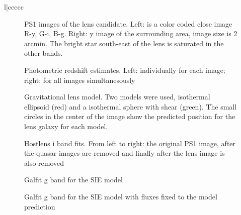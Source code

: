 \documentclass[manuscript]{aastex}
\begin{document}
\begin{deluxetable}{l|ccccc}
\enddata


\end{deluxetable}


\begin{figure}
\caption{
PS1 images of the lens candidate. Left: is a color coded close image R-y, G-i, B-g. Right: y image of the surrounding area, image size is 2 arcmin. The bright star south-east of the lens is saturated in the other bands.
}
\label{lens}
\end{figure}



\begin{figure}
\caption{
Photometric redshift estimates. 
Left: individually for each image; right: for all images simultanesously}
\label{redshift}
\end{figure}


\begin{figure}
\caption{
Gravitational lens model. Two models were used, isothermal ellipsoid (red) and a isothermal sphere with shear (green). The small circles in the center of the image show the predicted position for the lens galaxy for each model.}
\label{model}
\end{figure}

\begin{figure}
\caption{
Hostlens i band fits. From left to right: the original PS1 image, after the quasar images are removed and finally after the lens image is also removed}
\label{hostlensi}
\end{figure}


\begin{figure}
\caption{
Galfit g band for the SIE model}
\label{galfitgSIE}
\end{figure}

\begin{figure}
\caption{
Galfit g band for the SIE model with fluxes fixed to the model prediction}
\label{galfitg}
\end{figure}
\end{document}
